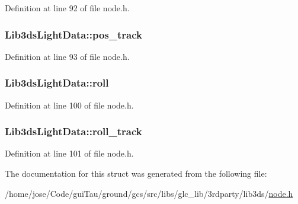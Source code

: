 Definition at line 92 of file node.\-h.

\hypertarget{struct_lib3ds_light_data_a69962a46cbafca2d3216c8fc98f4ffc4}{
\subsubsection[{pos\-\_\-track}]{ Lib3ds\-Light\-Data\-::pos\-\_\-track}}\label{struct_lib3ds_light_data_a69962a46cbafca2d3216c8fc98f4ffc4}


Definition at line 93 of file node.\-h.

\hypertarget{struct_lib3ds_light_data_aab6fef9d8ac6fb70b962e39dbd7ea701}{
\subsubsection[{roll}]{ Lib3ds\-Light\-Data\-::roll}}\label{struct_lib3ds_light_data_aab6fef9d8ac6fb70b962e39dbd7ea701}


Definition at line 100 of file node.\-h.

\hypertarget{struct_lib3ds_light_data_ae1773687fe4ed47d73c2656b51c590be}{
\subsubsection[{roll\-\_\-track}]{ Lib3ds\-Light\-Data\-::roll\-\_\-track}}\label{struct_lib3ds_light_data_ae1773687fe4ed47d73c2656b51c590be}


Definition at line 101 of file node.\-h.



The documentation for this struct was generated from the following file\-:\begin{DoxyCompactItemize}
\item 
/home/jose/\-Code/gui\-Tau/ground/gcs/src/libs/glc\-\_\-lib/3rdparty/lib3ds/\hyperlink{node_8h}{node.\-h}\end{DoxyCompactItemize}
